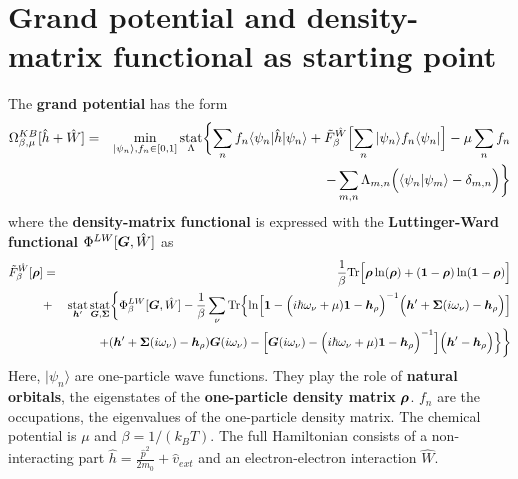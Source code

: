 \documentclass[11pt,a4paper]{report}
\begin{document}
\section{Grand potential and density-matrix 
functional as starting point}
The \textbf{grand potential}
 has the form\cite{bloechl13_prb88_25139}
\begin{eqnarray}
\Omega^{KB}_{\beta,\mu}[\hat{h}+\hat{W}]
&=&\min_{|\psi_n\rangle,f_n\in[0,1]}\operatorname*{stat}_\Lambda
\biggl\lbrace\sum_n f_n\langle\psi_n|\hat{h}|\psi_n\rangle
+\tilde{F}_\beta^{\hat{W}}\Bigl[\sum_n|\psi_n\rangle f_n\langle\psi_n|\Bigr]
-\mu\sum_n f_n\nonumber\\
&&
-\sum_{m,n}\Lambda_{m,n}\Bigl(\langle\psi_n|\psi_m\rangle-\delta_{m,n}\Bigr)
\biggr\rbrace
\label{eq:gcpdm2}
\end{eqnarray}
where the \textbf{density-matrix functional} is expressed with the \textbf{Luttinger-Ward
  functional}
\cite{luttinger60_pr118_1417} $\Phi^{LW}[\bm{G},\hat{W}]$ as
\begin{eqnarray}
\tilde{F}^{\hat{W}}_\beta[\bm{\rho}]
&=&
\frac{1}{\beta}\mathrm{Tr}\Bigl[
\bm{\rho}\ln(\bm{\rho})+(\bm{1}-\bm{\rho})\ln(\bm{1}-\bm{\rho})\Bigr]
\nonumber\\
&+&
\operatorname*{stat}_{\bm{h}'}\operatorname*{stat}_{\bm{G},\bm{\Sigma}}
\biggl\lbrace
\Phi^{LW}_\beta[\bm{G},\hat{W}]
-\frac{1}{\beta}\sum_\nu\mathrm{Tr}\Bigl\lbrace
\ln\Bigl[
\bm{1}-
\Bigl(i\hbar\omega_\nu+\mu)\bm{1}-\bm{h}_{\rho}\Bigr)^{-1}
\Bigl(\bm{h}'+\bm{\Sigma}(i\omega_\nu)-\bm{h}_{\rho}\Bigr)
\Bigr]
\nonumber\\&&
+(\bm{h}'+\bm{\Sigma}(i\omega_\nu)-\bm{h}_\rho)\bm{G}(i\omega_\nu)
-
\Bigl[
\bm{G}(i\omega_\nu)
-\Bigl(i\hbar\omega_\nu+\mu)\bm{1}-\bm{h}_{\rho}\Bigr)^{-1}
\Bigr]
\Bigl(\bm{h}'-\bm{h}_\rho\Bigr)\Bigr\rbrace
\biggr\rbrace
\label{eq:dmfgreen}
\end{eqnarray}
Here, $|\psi_n\rangle$ are one-particle wave functions. They play the
role of \textbf{natural orbitals}, the
eigenstates of the \textbf{one-particle density
  matrix}
$\bm{\rho}$. $f_n$ are the occupations, the eigenvalues of the
one-particle density matrix. The chemical potential is $\mu$ and
$\beta=1/(k_BT)$. The full Hamiltonian consists of a non-interacting
part $\hat{h}=\frac{\hat{p}^2}{2m_0}+\hat{v}_{ext}$ and an
electron-electron interaction $\hat{W}$.
\end{document}

